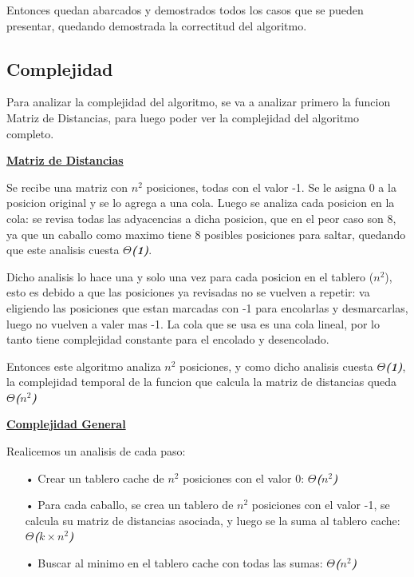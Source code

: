 Entonces quedan abarcados y demostrados todos los casos que se pueden presentar, quedando demostrada la correctitud del algoritmo.

\subsection{Complejidad}
Para analizar la complejidad del algoritmo, se va a analizar primero la funcion Matriz de Distancias, para luego poder ver la complejidad del algoritmo completo.

\bigskip
\noindent \underline{\textbf{Matriz de Distancias}}

Se recibe una matriz con $n^2$ posiciones, todas con el valor -1. Se le asigna 0 a la posicion original y se lo agrega a una cola. Luego se analiza cada posicion en la cola: se revisa todas las adyacencias a dicha posicion, que en el peor caso son 8, ya que un caballo como maximo tiene 8 posibles posiciones para saltar, quedando que este analisis cuesta \textbf{\textit{$\Theta$(1)}}.

Dicho analisis lo hace una y solo una vez para cada posicion en el tablero ($n^2$), esto es debido a que las posiciones ya revisadas no se vuelven a repetir: va eligiendo las posiciones que estan marcadas con -1 para encolarlas y desmarcarlas, luego no vuelven a valer mas -1. La cola que se usa es una cola lineal, por lo tanto tiene complejidad constante para el encolado y desencolado.

Entonces este algoritmo analiza $n^2$ posiciones, y como dicho analisis cuesta \textbf{\textit{$\Theta$(1)}}, la complejidad temporal de la funcion que calcula la matriz de distancias queda \textbf{\textit{$\Theta$($n^2$)}}

\bigskip
\noindent \underline{\textbf{Complejidad General}}

Realicemos un analisis de cada paso:
\begin{itemize}
\item[•]Crear un tablero cache de $n^2$ posiciones con el valor 0: \textbf{\textit{$\Theta$($n^2$)}}
\item[•]Para cada caballo, se crea un tablero de $n^2$ posiciones con el valor -1, se calcula su matriz de distancias asociada, y luego se la suma al tablero cache: \textbf{\textit{$\Theta$($k \times n^2$)}}
\item[•]Buscar al minimo en el tablero cache con todas las sumas: \textbf{\textit{$\Theta$($n^2$)}}
\end{itemize}

